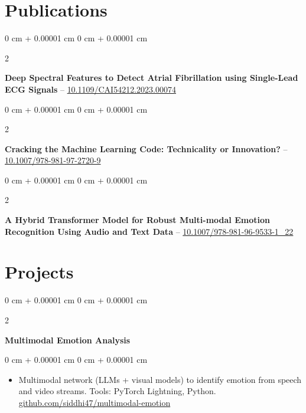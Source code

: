 \documentclass[10pt, letterpaper]{article}
\newenvironment{highlights}{
    \begin{itemize}[
        topsep=0.04 cm,
        parsep=0.04 cm,
        partopsep=0pt,
        itemsep=0pt,
        leftmargin=0 cm + 10pt
    ]
}{
    \end{itemize}
} %
\newenvironment{onecolentry}{
    \begin{adjustwidth}{
        0 cm + 0.00001 cm
    }{
        0 cm + 0.00001 cm
    }
}{
    \end{adjustwidth}
} %
\newenvironment{twocolentry}[2][]{
    \onecolentry
    \def\secondColumn{#2}
    \setcolumnwidth{\fill, 4.5 cm}
    \begin{paracol}{2}
}{
    \switchcolumn \raggedleft \secondColumn
    \end{paracol}
    \endonecolentry
} %
\begin{document}
    
    \section{Publications}
        
        \begin{samepage}
            \begin{twocolentry}{
                2023
            }
                \textbf{Deep Spectral Features to Detect Atrial Fibrillation using Single-Lead ECG Signals} -- \href{https://ieeexplore.ieee.org/document/10195073}{10.1109/CAI54212.2023.00074}
            \end{twocolentry}
        \end{samepage}

\vspace{0.06 cm}

     \begin{samepage}
            \begin{twocolentry}{
                2024
            }
                \textbf{Cracking the Machine Learning Code: Technicality or Innovation?} -- \href{https://doi.org/10.1007/978-981-97-2720-9}{10.1007/978-981-97-2720-9}
            \end{twocolentry}
        \end{samepage}
\vspace{0.06 cm}

    \begin{samepage}
            \begin{twocolentry}{
                2025
            }
                \textbf{A Hybrid Transformer Model for Robust Multi-modal Emotion Recognition Using Audio and Text Data} -- \href{https://link.springer.com/chapter/10.1007/978-981-96-9533-1_22}{10.1007/978-981-96-9533-1\_22}
            \end{twocolentry}
        \end{samepage}
    
    \section{Projects}

        \begin{twocolentry}{
        }
            \textbf{Multimodal Emotion Analysis}\end{twocolentry}

        \vspace{0.06 cm}
        \begin{onecolentry}
            \begin{highlights}
                \item Multimodal network (LLMs + visual models) to identify emotion from speech and video streams. Tools: PyTorch Lightning, Python. \href{https://github.com/siddhi47/multimodal-emotion}{github.com/siddhi47/multimodal-emotion}
            \end{highlights}
        \end{onecolentry}
\end{document}
